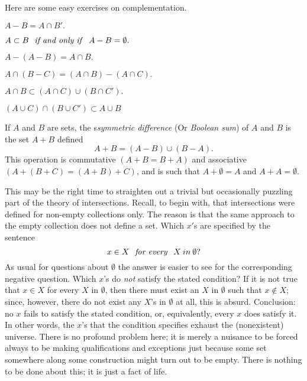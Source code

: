 Here are some easy exercises on complementation. 
\begin{center}
$A - B = A \cap B'.$

$A \subset B \text{ \textit{ if and only if } } A - B = \emptyset .$

$A - (A - B) = A \cap B.$

$A \cap (B - C) = (A \cap B) - (A \cap C).$

$A \cap B  \subset (A \cap C) \cup (B \cap C').$

$(A \cup C) \cap (B \cup C') \subset A \cup B$
\end{center}
If $A$ and $B$ are sets, the s\textit{symmetric difference} (Or \textit{Boolean sum}) of $A$ and $B$ is the set $A + B$ defined 
\begin{equation*}
A + B = (A - B) \cup (B - A). 
\end{equation*}
This operation is commutative $(A + B = B + A)$ and associative $(A + (B + C) =  (A + B) + C)$, and is such that $A + \emptyset = A$ and $A + A = \emptyset$.

This may be the right time to straighten out a trivial but occasionally puzzling part of the theory of intersections. Recall, to begin with, that intersections were defined for non-empty collections only. The reason is that the same approach to the empty collection does not define a set. Which $x'$s are specified by the sentence 
\begin{equation*}
x \in X \text{ \textit{ for every } } X \: in \: \emptyset ? 
\end{equation*}
As usual for questions about $ \emptyset $ the answer is easier to see for the corresponding negative question. Which $x$'s do \textit{not} satisfy the stated condition? If it is not true that $x \in X$ for every $X$ in $\emptyset$, then there must exist an $X$ in $\emptyset$ such that $x \notin X$; since, however, there do not exist any $X$'s in $ \emptyset $ at all, this is absurd. Conclusion: no $x$ fails to satisfy the stated condition, or, equivalently, every $x$ does satisfy it. In other words, the $x$'s that the condition specifies exhaust the (nonexistent) universe. There is no profound problem here; it is merely a nuisance to be forced always to be making qualifications and exceptions just because some set somewhere along some construction might turn out to be empty. There is nothing to be done about this; it is just a fact of life. 

